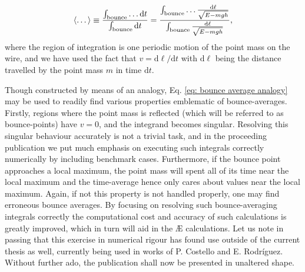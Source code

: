 \begin{equation}
    \langle \dots \rangle \equiv \frac{ \int_{\rm bounce} \dots \mathrm{d} t }{ \int_{\rm bounce} \mathrm{d} t } = \frac{ \int_{\rm bounce} \dots \frac{\mathrm{d} \ell}{\sqrt{E - mgh}} }{ \int_{\rm bounce} \frac{\mathrm{d} \ell}{\sqrt{E - mgh}} },
    \label{eq: bounce average analogy}
\end{equation}
where the region of integration is one periodic motion of the point mass on the wire, and we have used the fact that $v = \mathrm{d}\ell/\mathrm{d}t$ with $\mathrm{d}\ell$ being the distance travelled by the point mass $m$ in time $\mathrm{d} t$. \par 
Though constructed by means of an analogy, Eq. \eqref{eq: bounce average analogy} may be used to readily find various properties emblematic of bounce-averages. Firstly, regions where the point mass is reflected (which will be referred to as bounce-points) have $v=0$, and the integrand becomes singular. Resolving this singular behaviour accurately is not a trivial task, and in the proceeding publication we put much emphasis on executing such integrals correctly numerically by including benchmark cases. Furthermore, if the bounce point approaches a local maximum, the point mass will spent all of its time near the local maximum and the time-average hence only cares about values near the local maximum. Again, if not this property is not handled properly, one may find erroneous bounce averages. By focusing on resolving such bounce-averaging integrals correctly the computational cost and accuracy of such calculations is greatly improved, which in turn will aid in the \AE{} calculations. Let us note in passing that this exercise in numerical rigour has found use outside of the current thesis as well, currently being used in works of P. Costello and E. Rodr\'iguez. Without further ado, the publication shall now be presented in unaltered shape.
\vfill \newpage

